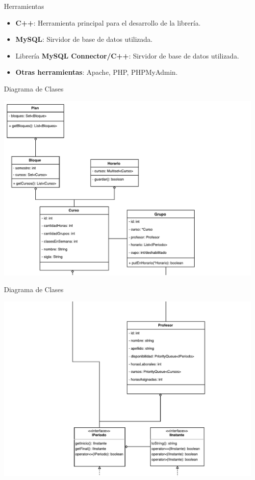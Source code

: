 \begin{frame}{Herramientas}
    \begin{block}
        \begin{itemize}
            \item \textbf{C++}: Herramienta principal para el desarrollo de la
                librería.
            \item \textbf{MySQL}: Sirvidor de base de datos utilizada.
            \item Librería \textbf{MySQL Connector/C++}: Sirvidor de base de
                datos utilizada.
            \item \textbf{Otras herramientas}: Apache, PHP, PHPMyAdmin.
        \end{itemize}
    \end{block}
\end{frame}


\begin{frame}{Diagrama de Clases}
\begin{center}
    \includegraphics[width=\textwidth]{diagramaClases1}
\end{center}
\end{frame}

\begin{frame}{Diagrama de Clases}
\begin{center}
    \includegraphics[width=\textwidth]{diagramaClases2}
\end{center}
\end{frame}

